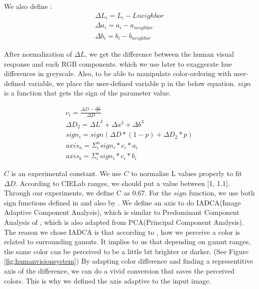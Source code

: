 \documentclass{article}
\begin{document}
We also define :
\begin{eqnarray}
\Delta L_i=L_i-L{neighbor} \\
\Delta a_i=a_i-a_{neighbor} \\
\Delta b_i=b_i-b_{neighbor}
\end{eqnarray}

After normalization of $\Delta L$, we get the difference between the human visual response and each RGB components. which we use later to exaggerate hue differences in greyscale. Also, to be able to manipulate color-ordering with user-defined variable, we place the user-defined variable p in the below equation. $sign$ is a function that gets the sign of the parameter value.

\begin{eqnarray}
c_i = \frac { \Delta D - \frac{\Delta L}{ C }  } {\Delta D } \\
\Delta D_2 = \Delta L^3 + \Delta a^3 + \Delta b^3 \\
sign_i = sign(  \Delta D * (1-p) + \Delta D_2 * p ) \\
axis_a = \Sigma_i^n sign_i * c_i * a_i  \\
axis_b = \Sigma_i^n sign_i * c_i * b_i 
\end{eqnarray}

$C$ is an experimental constant. We use $C$ to normalize L values properly to fit $\Delta D$. According to CIELab ranges, we should put a value between [1, 1.1]. Through our experiments, we define C as 0.67. For the $sign$ function, we use both sign functions defined in \cite {cadik07color_to_gray} and also by \cite{journals/pr/GrundlandD07}. We define an axis to do IADCA(Image Adaptive Component Analysis), which is similar to Predominant Component Analysis of \cite{journals/pr/GrundlandD07}, which is also adapted from PCA(Principal Component Analysis). The reason we chose IADCA is that according to \cite{Hunt}, how we perceive a color is related to surrounding gamuts. It implies to us that depending on gamut ranges, the same color can be perceived to be a little bit brighter or darker. (See Figure \ref{fig:humanvisionsystem}) By adapting color difference and finding a representitive axis of the difference, we can do a vivid conversion that saves the perceived colors. This is why we defined the axis adaptive to the input image.
\end{document}
